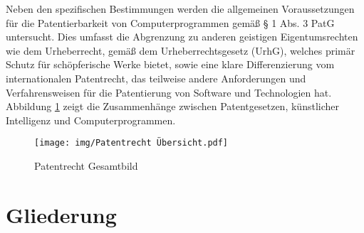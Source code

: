 Neben den spezifischen Bestimmungen werden die allgemeinen Voraussetzungen 
für die Patentierbarkeit von Computerprogrammen gemäß § 1 Abs. 3 PatG untersucht. 
Dies umfasst die Abgrenzung zu anderen geistigen Eigentumsrechten wie dem Urheberrecht, 
gemäß dem Urheberrechtsgesetz (UrhG), welches primär Schutz für schöpferische Werke bietet, 
sowie eine klare Differenzierung vom internationalen Patentrecht, 
das teilweise andere Anforderungen und Verfahrensweisen für die Patentierung von Software und Technologien hat.
\\

Abbildung \ref{fig:patentrecht} zeigt die Zusammenhänge zwischen Patentgesetzen, 
künstlicher Intelligenz und Computerprogrammen.
\\
\begin{figure}[htb]
  \centering
  \texttt{[image: img/Patentrecht Übersicht.pdf]}\\
  \caption{Patentrecht Gesamtbild}\label{fig:patentrecht}
\end{figure}

\section{Gliederung\label{sec:outline}}



